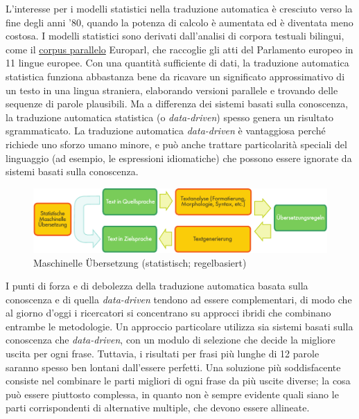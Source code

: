 \documentclass[]{../../metanetpaper}
\begin{document}
\begin{multicols}{2}
L'interesse per i modelli statistici nella traduzione automatica \`{e} cresciuto verso la fine degli anni '80, quando la potenza di calcolo \`{e} aumentata ed \`{e} diventata meno costosa. I modelli statistici sono derivati dall'analisi di corpora testuali bilingui, come il \underline{corpus parallelo} Europarl, che raccoglie gli atti del Parlamento europeo in 11 lingue europee. Con una quantit\`{a} sufficiente di dati, la traduzione automatica statistica funziona abbastanza bene da ricavare un significato approssimativo di un testo in una lingua straniera, elaborando versioni parallele e trovando delle sequenze di parole plausibili. Ma a differenza dei sistemi basati sulla conoscenza, la traduzione automatica statistica (o \emph{data-driven}) spesso genera un risultato sgrammaticato. La traduzione automatica \emph{data-driven} \`{e} vantaggiosa perch\'{e} richiede uno sforzo umano minore, e pu\`{o} anche trattare particolarit\`{a} speciali del linguaggio (ad esempio, le espressioni idiomatiche) che possono essere ignorate da sistemi basati sulla conoscenza.


\begin{figure}[htb]
  \center
  \includegraphics[width=\textwidth]{../_media/german/machine_translation}
  \caption{Maschinelle Übersetzung (statistisch; regelbasiert)}
  \label{fig:mtarch_de}
\end{figure}

I punti di forza e di debolezza della traduzione automatica basata sulla conoscenza e di quella \emph{data-driven} tendono ad essere complementari, di modo che al giorno d'oggi i ricercatori si concentrano su approcci ibridi che combinano entrambe le metodologie. Un approccio particolare utilizza sia sistemi basati sulla conoscenza che \emph{data-driven}, con un modulo di selezione che decide la migliore uscita per ogni frase. Tuttavia, i risultati per frasi pi\`{u} lunghe di 12 parole saranno spesso ben lontani dall'essere perfetti. Una soluzione pi\`{u} soddisfacente consiste nel combinare le parti migliori di ogni frase da pi\`{u} uscite diverse; la cosa pu\`{o} essere piuttosto complessa, in quanto non \`{e} sempre evidente quali siano le parti corrispondenti di alternative multiple, che devono essere allineate.




\end{multicols}
\end{document}
